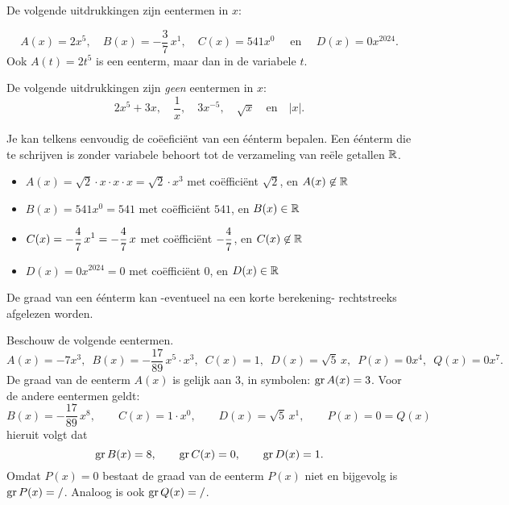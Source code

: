 \documentclass{ximera}
\begin{document}
\begin{example} 
De volgende uitdrukkingen zijn eentermen in $x$:
	
\[
A(x) = 2x^5, 
\quad B(x) = -\frac{3}{7}\,x^1, 
\quad C(x) = 541x^0 \quad \text{ en } 
\quad D(x) = 0x^{2024}.
\]
Ook $A(t) = 2t^5$ is een eenterm, maar dan in de variabele $t$. 
\end{example}

\begin{example}
De volgende uitdrukkingen zijn \textit{geen} eentermen in $x$:
\[
2x^5+3x, 
\quad \frac{1}{x}, 
\quad 3x^{-5}, 
\quad \sqrt{x} 
\quad \text{en} \quad \left|x\right|.
\] 
\end{example} 



Je kan telkens eenvoudig de coëeficiënt van een éénterm bepalen. Een éénterm die te schrijven is zonder variabele behoort tot de verzameling van reële getallen \(\mathbb{R}\). 



\begin{example} 
\begin{itemize}
\item  $A(x) = \sqrt{2}\cdot x \cdot x \cdot x = \sqrt{2}\cdot x^3$  met coëfficiënt $\sqrt{2}$, en $A(x) \not\in \mathbb{R}$
\item  $B(x) = 541x^0 = 541$                                         met coëfficiënt $541$, en $B(x) \in \mathbb{R}$ 
\item  $\displaystyle C(x) = -\frac{4}{7}\,x^1 = -\frac{4}{7}\,x$               met coëfficiënt $\displaystyle -\frac{4}{7}$, en $C(x) \not\in \mathbb{R}$
\item  $D(x) = 0 x^{2024} = 0$                                       met coëfficiënt $0$, en $D(x) \in \mathbb{R}$ 
\end{itemize}
\end{example} 


De graad van een éénterm kan -eventueel na een korte berekening- rechtstreeks afgelezen worden. 

\begin{example} 
Beschouw de volgende eentermen.
\[
A(x) = -7x^3, \,\,\, B(x) = -\frac{17}{89}\,x^5\cdot x^3, \,\,\, C(x) = 1, \,\,\, D(x) = \sqrt{5}\,x, \,\,\, P(x) = 0 x^4, \,\,\,  Q(x) = 0 x^7.
\]
De graad van de eenterm $A(x)$ is gelijk aan $3$, in symbolen: $\operatorname{gr} A(x) = 3$. 
Voor de andere eentermen geldt:  
\[
B(x) = -\frac{17}{89}\,x^8, \qquad C(x) = 1\cdot x^0, \qquad D(x) = \sqrt{5}\,x^1, \qquad P(x) = 0 = Q(x)
\]
hieruit volgt dat
\[
\operatorname{gr} B(x) = 8, \qquad \operatorname{gr} C(x) = 0, \qquad \operatorname{gr} D(x) = 1. 
\]
Omdat $P(x) = 0$ bestaat de graad van de eenterm $P(x)$ niet en bijgevolg is $\operatorname{gr} P(x) = /$. Analoog is ook $\operatorname{gr} Q(x) = /$.
\end{example} 
\end{document}
